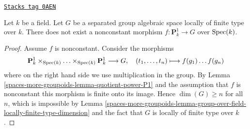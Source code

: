 \begin{lemma}
\label{spaces-more-groupoids-lemma-no-nonconstant-morphism-from-P1-to-group}
\href{https://stacks.math.columbia.edu/tag/0AEN}{\texttt{Stacks tag 0AEN}}


Let $k$ be a field. Let $G$ be a separated group algebraic space locally
of finite type over $k$. There does not exist a nonconstant
morphism $f : \mathbf{P}^1_k \to G$ over $\operatorname{Spec}(k)$.
\end{lemma}

\begin{proof}
Assume $f$ is nonconstant. Consider the morphisms
$$
\mathbf{P}^1_k \times_{\operatorname{Spec}(k)} \ldots \times_{\operatorname{Spec}(k)} \mathbf{P}^1_k
\longrightarrow G,
\quad (t_1, \ldots, t_n) \longmapsto f(g_1) \ldots f(g_n)
$$
where on the right hand side we use multiplication in the group.
By Lemma \ref{spaces-more-groupoids-lemma-quotient-power-P1} and the assumption that $f$
is nonconstant this morphism is finite onto its image.
Hence $\dim(G) \geq n$ for all $n$, which is impossible by
Lemma \ref{spaces-more-groupoids-lemma-group-over-field-locally-finite-type-dimension}
and the fact that $G$ is locally of finite type over $k$.
\end{proof}

